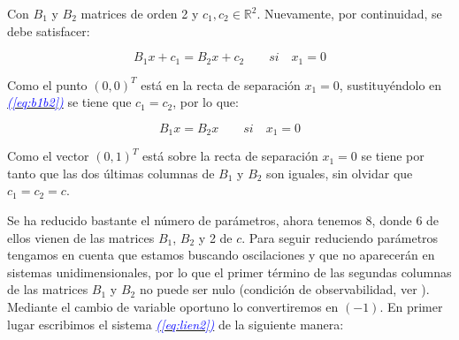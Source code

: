 \documentclass[12pt,a4paper]{report} %
\newcommand{\eref}[1]{\hyperref[#1]{\textcolor{blue}{\textit{(\ref*{#1})}}}}
\begin{document}
	\noindent Con $B_1$ y $B_2$ matrices de orden 2 y $c_1, c_2 \in \mathbb{R}^2$. Nuevamente, por continuidad, se debe satisfacer:
	
	\begin{equation}
		\label{eq:b1b2}
		B_1x+c_1=B_2x+c_2 \qquad si \quad x_1=0
	\end{equation}\smallskip
	
	\noindent Como el punto $(0,0)^T$ está en la recta de separación $x_1=0$, sustituyéndolo en \eref{eq:b1b2} se tiene que $c_1=c_2$, por lo que:
	
	\begin{equation}
		B_1x=B_2x \qquad si \quad x_1=0
	\end{equation}\smallskip
	
	\noindent Como el vector $(0,1)^T$ está sobre la recta de separación $x_1=0$ se tiene por tanto que las dos últimas columnas de $B_1$ y $B_2$ son iguales, sin olvidar que $c_1=c_2=c$.


	\vspace{0.5cm}Se ha reducido bastante el número de parámetros, ahora tenemos 8, donde 6 de ellos vienen de las matrices $B_1$, $B_2$ y 2 de $c$. Para seguir reduciendo parámetros tengamos en cuenta que estamos buscando oscilaciones y que no aparecerán en sistemas unidimensionales, por lo que el primer término de las segundas columnas de las matrices $B_1$ y $B_2$ no puede ser nulo (condición de observabilidad, ver \cite{onsimplyfing}). Mediante el cambio de variable oportuno lo convertiremos en $(-1)$. En primer lugar escribimos el sistema \eref{eq:lien2} de la siguiente manera:
	
\end{document}
